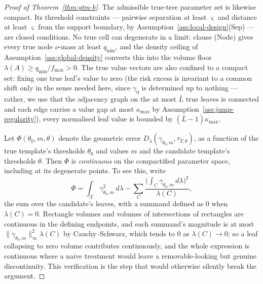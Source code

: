 \documentclass[11pt]{article}
\theoremstyle{plain}
\theoremstyle{definition}
\theoremstyle{remark}
\newcommand{\cX}{\mathcal{X}}
\begin{document}
\begin{proof}[Proof of Theorem~\ref{thm:gtm-b}]
The admissible true-tree parameter set is likewise compact. Its threshold
constraints --- pairwise separation at least \(\varsigma\) and distance at
least \(\varsigma\) from the support boundary, by
Assumption~\ref{ass:local-design}(Sep) --- are closed conditions. No true cell
can degenerate in a limit: clause (Node) gives every true node \(\nu\)-mass at
least \(q_{\min}\), and the density ceiling of
Assumption~\ref{ass:global-density} converts this into the volume floor
\(\lambda(A)\ge q_{\min}/f_{\max}>0\). The true value vectors are also
confined to a compact set: fixing one true leaf's value to zero (the risk
excess is invariant to a common shift only in the sense needed here, since
\(\gamma_0\) is determined up to nothing --- rather, we use that the
adjacency graph on the at most \(\bar L\) true leaves is connected and each
edge carries a value gap at most \(\kappa_{\max}\) by
Assumption~\ref{ass:jump-regularity}), every normalised leaf value is bounded
by \((\bar L-1)\kappa_{\max}\).

Let \(\Phi(\theta_0,m,\theta)\) denote the geometric error
\(D_\lambda(\gamma_{\theta_0,m},\tau_{T,\theta})\), as a function of the true
template's thresholds \(\theta_0\) and values \(m\) and the candidate
template's thresholds \(\theta\). Then \(\Phi\) is \emph{continuous} on the
compactified parameter space, including at its degenerate points. To see this,
write
\[
  \Phi
  =
  \int_\cX\gamma_{\theta_0,m}^2\,d\lambda
  -
  \sum_{C}\frac{\bigl(\int_C\gamma_{\theta_0,m}\,d\lambda\bigr)^2}
                {\lambda(C)},
\]
the sum over the candidate's leaves, with a summand defined as \(0\) when
\(\lambda(C)=0\). Rectangle volumes and volumes of intersections of rectangles
are continuous in the defining endpoints, and each summand's magnitude is at
most \(\|\gamma_{\theta_0,m}\|_\infty^2\lambda(C)\) by Cauchy--Schwarz, which
tends to \(0\) as \(\lambda(C)\to0\); so a leaf collapsing to zero volume
contributes continuously, and the whole expression is continuous where a
naive treatment would leave a removable-looking but genuine discontinuity.
This verification is the step that would otherwise silently break the
argument.


\end{proof}
\end{document}
